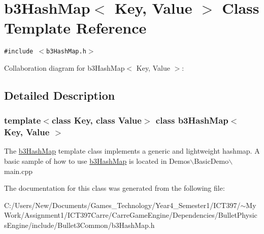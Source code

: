 \hypertarget{classb3_hash_map}{
\section{b3HashMap$<$ Key, Value $>$ Class Template Reference}
\label{classb3_hash_map}
}
{\tt \#include $<$b3HashMap.h$>$}

Collaboration diagram for b3HashMap$<$ Key, Value $>$:

\subsection{Detailed Description}
\subsubsection*{template$<$class Key, class Value$>$ class b3HashMap$<$ Key, Value $>$}

The \hyperlink{classb3_hash_map}{b3HashMap} template class implements a generic and lightweight hashmap. A basic sample of how to use \hyperlink{classb3_hash_map}{b3HashMap} is located in Demos$\backslash$BasicDemo$\backslash$main.cpp 

The documentation for this class was generated from the following file:\begin{CompactItemize}
\item 
C:/Users/New/Documents/Games\_\-Technology/Year4\_\-Semester1/ICT397/$\sim$My Work/Assignment1/ICT397Carre/CarreGameEngine/Dependencies/BulletPhysicsEngine/include/Bullet3Common/b3HashMap.h\end{CompactItemize}
